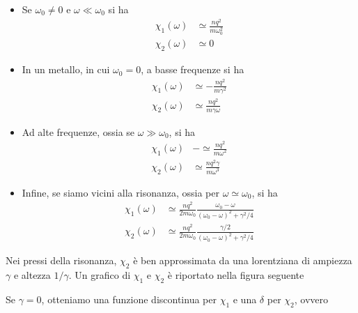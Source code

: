 \documentclass[a4paper,11pt]{book}
\theoremstyle{theorem}
\theoremstyle{definition}
\begin{document}
\begin{itemize}
	\item Se $\omega_0\neq 0$ e $\omega\ll\omega_0$ si ha
	\begin{align*}
		\chi_1(\omega)&\simeq\frac{nq^2}{m\omega_0^2}\\\chi_2(\omega)&\simeq 0
	\end{align*}
	\item In un metallo, in cui $\omega_0=0$, a basse frequenze si ha
	\begin{align*}
		\chi_1(\omega)&\simeq-\frac{nq^2}{m\gamma^2}\\\chi_2(\omega)&\simeq\frac{nq^2}{m\gamma\omega}
	\end{align*}
	\item Ad alte frequenze, ossia se $\omega\gg\omega_0$, si ha
	\begin{align*}
	\chi_1(\omega)&-\simeq\frac{nq^2}{m\omega^2}\\\chi_2(\omega)&\simeq \frac{nq^2\gamma}{m\omega^3}
	\end{align*}
	\item Infine, se siamo vicini alla risonanza, ossia per $\omega\simeq\omega_0$, si ha
	\begin{align*}
		\chi_1(\omega)&\simeq\frac{nq^2}{2m\omega_0}\frac{\omega_0-\omega}{(\omega_0-\omega)^2+\gamma^2/4}\\\chi_2(\omega)&\simeq\frac{nq^2}{2m\omega_0}\frac{\gamma/2}{(\omega_0-\omega)^2+\gamma^2/4}
	\end{align*}
\end{itemize}
Nei pressi della risonanza, $\chi_2$ è ben approssimata da una lorentziana di ampiezza $\gamma$ e altezza $1/\gamma$. Un grafico di $\chi_1$ e $\chi_2$ è riportato nella figura seguente\newpage
\begin{figure}[h]
	\centering
\end{figure}
\noindent Se $\gamma=0$, otteniamo una funzione discontinua per $\chi_1$ e una $\delta$ per $\chi_2$, ovvero
\begin{figure}[h]
	\centering
\end{figure}
\end{document}
